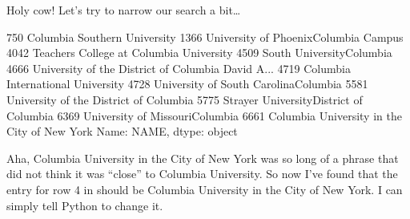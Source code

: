 \documentclass[letterpaper,10pt,english]{jupyterBook}
\begin{document}
\sphinxAtStartPar
Holy cow!  Let’s try to narrow our search a bit…

\begin{sphinxVerbatim}[commandchars=\\\{\}]
\PYG{p}{[}\PYG{p}{[}\PYG{p}{]}  
      \PYG{p}{[}\PYG{p}{]}  \PYG{p}{]}\PYG{p}{[}\PYG{p}{]}
\end{sphinxVerbatim}

\begin{sphinxVerbatim}[commandchars=\\\{\}]
750                          Columbia Southern University
1366                University of Phoenix\PYGZhy{}Columbia Campus
4042              Teachers College at Columbia University
4509                            South University\PYGZhy{}Columbia
4666    University of the District of Columbia David A...
4719                    Columbia International University
4728                University of South Carolina\PYGZhy{}Columbia
5581               University of the District of Columbia
5775              Strayer University\PYGZhy{}District of Columbia
6369                      University of Missouri\PYGZhy{}Columbia
6661          Columbia University in the City of New York
Name: NAME, dtype: object
\end{sphinxVerbatim}

\sphinxAtStartPar
Aha, Columbia University in the City of New York was so long of a phrase that  did not think it was “close” to Columbia University.  So now I’ve found that the entry for row 4 in  should be Columbia University in the City of New York.  I can simply tell Python to change it.

\begin{sphinxVerbatim}[commandchars=\\\{\}]
\PYG{p}{[}\PYG{p}{]}  
\end{sphinxVerbatim}
\end{document}
